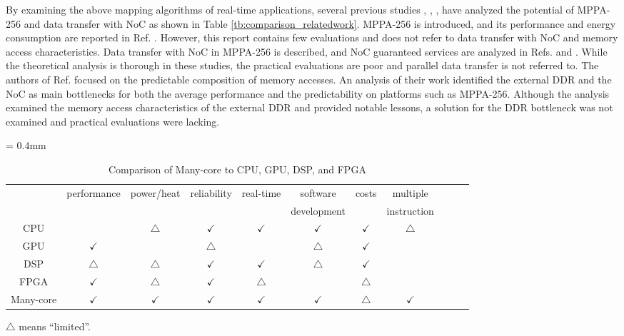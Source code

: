 \documentclass[conference,compsoc]{IEEEtran}
\begin{document}
By examining the above mapping algorithms of real-time applications, several previous studies \cite{kanter2015kalray}, \cite{denet2017work}, \cite{deDinechin2014GSN}, \cite{perret2016predictable} have analyzed the potential of MPPA-256 and data transfer with NoC as shown in Table \ref{tb:comparison_relatedwork}.
MPPA-256 is introduced, and its performance and energy consumption are reported in Ref. \cite{kanter2015kalray}.
However, this report contains few evaluations and does not refer to data transfer with NoC and memory access characteristics.
Data transfer with NoC in MPPA-256 is described, and NoC guaranteed services are analyzed in Refs. \cite{denet2017work} and \cite{deDinechin2014GSN}.
While the theoretical analysis is thorough in these studies, the practical evaluations are poor and parallel data transfer is not referred to.
The authors of Ref. \cite{perret2016predictable} focused on the predictable composition of memory accesses.
An analysis of their work identified the external DDR and the NoC as main bottlenecks for both the average performance and the predictability on platforms such as MPPA-256.
Although the analysis examined the memory access characteristics of the external DDR and provided notable lessons, a solution for the DDR bottleneck was not examined and practical evaluations were lacking.

\begin{table}[t]
  \caption{\label{tb:comparison_platforms}
    Comparison of Many-core to CPU, GPU, DSP, and FPGA}
  \centering
  \scriptsize	                    %
  \tabcolsep = 0.4mm              %
  \begin{tabular}{c|cccccccccc}
    \hline
    & \multirow{2}{*}{performance} & \multirow{2}{*}{power/heat} & \multirow{2}{*}{reliability} & \multirow{2}{*}{real-time} & software & \multirow{2}{*}{costs} & multiple\\
    &&&&& development && instruction \\
    \hline
    \hline
    CPU & & \(\bigtriangleup\) & \(\checkmark\) & \(\checkmark\) & \(\checkmark\) & \(\checkmark\) & \(\bigtriangleup\) \\
    GPU & \(\checkmark\) &  & \(\bigtriangleup\) &  & \(\bigtriangleup\) & \(\checkmark\)\\
    DSP & \(\bigtriangleup\) & \(\bigtriangleup\) & \(\checkmark\) & \(\checkmark\) & \(\bigtriangleup\) & \(\checkmark\) & \\
    FPGA & \(\checkmark\) & \(\bigtriangleup\) & \(\checkmark\) & \(\bigtriangleup\) &  & \(\bigtriangleup\) & \\
    Many-core & \(\checkmark\) & \(\checkmark\) & \(\checkmark\) & \(\checkmark\) & \(\checkmark\) & \(\bigtriangleup\) & \(\checkmark\) \\
    \hline
  \end{tabular}
  \begin{flushright}
   \textasteriskcentered  \(\bigtriangleup\) means ``limited''.
  \end{flushright}
  \vspace{-5mm}
\end{table}
\end{document}
